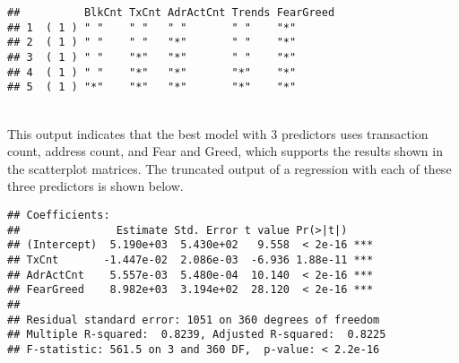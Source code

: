 \documentclass{article}
\begin{document}
\begin{verbatim}
##          BlkCnt TxCnt AdrActCnt Trends FearGreed
## 1  ( 1 ) " "    " "   " "       " "    "*"      
## 2  ( 1 ) " "    " "   "*"       " "    "*"      
## 3  ( 1 ) " "    "*"   "*"       " "    "*"      
## 4  ( 1 ) " "    "*"   "*"       "*"    "*"      
## 5  ( 1 ) "*"    "*"   "*"       "*"    "*"
\end{verbatim}
\mbox{} \\
This output indicates that the best model with 3 predictors uses
transaction count, address count, and Fear and Greed, which supports the results shown in the scatterplot matrices. The truncated output of a regression with each of these three predictors is shown below.

\begin{verbatim}
## Coefficients:
##               Estimate Std. Error t value Pr(>|t|)    
## (Intercept)  5.190e+03  5.430e+02   9.558  < 2e-16 ***
## TxCnt       -1.447e-02  2.086e-03  -6.936 1.88e-11 ***
## AdrActCnt    5.557e-03  5.480e-04  10.140  < 2e-16 ***
## FearGreed    8.982e+03  3.194e+02  28.120  < 2e-16 ***
## 
## Residual standard error: 1051 on 360 degrees of freedom
## Multiple R-squared:  0.8239, Adjusted R-squared:  0.8225 
## F-statistic: 561.5 on 3 and 360 DF,  p-value: < 2.2e-16
\end{verbatim}
\newpage
\end{document}
